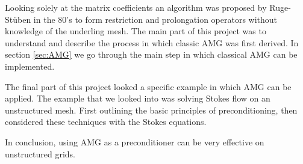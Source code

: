 \documentclass[11pt]{article}
\numberwithin{equation}{section}    %
\begin{document}
Looking solely at the matrix coefficients an algorithm was proposed by Ruge-St{\"u}ben in the 80's to form restriction and prolongation operators without knowledge of the underling mesh. The main part of this project was to understand and describe the process in which classic AMG was first derived. In section \ref{sec:AMG} we go through the main step in which classical AMG can be implemented.

The final part of this project looked a specific example in which AMG can be applied. The example that we looked into was solving Stokes flow on an unstructured mesh. First outlining the basic principles of preconditioning, then considered these techniques with the Stokes equations.

In conclusion, using AMG as a preconditioner can be very effective on unstructured grids.



\end{document}
